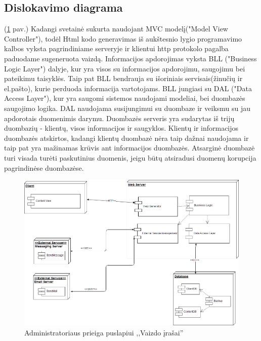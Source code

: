 \documentclass{VUMIFPSkursinis}
\begin{document}
		\subsection{Dislokavimo diagrama} (\ref{fig:dislokavimo} pav.)
		Kadangi svetainė sukurta naudojant MVC modelį("Model View Controller"), todėl Html kodo generavimas iš aukštesnio lygio programavimo kalbos vyksta pagrindiniame serveryje ir klientui http protokolo pagalba paduodame sugeneruota vaizdą. Informacijos apdorojimas vyksta BLL ("Business Logic Layer") dalyje, kur yra visos su informacijos apdorojimu, saugojimu bei pateikimu taisyklės. Taip pat BLL bendrauja su išoriniais servisais(žinučių ir el.pašto), kurie perduoda informacija vartotojams. BLL jungiasi su DAL ("Data Access Layer"), kur yra saugomi sistemos naudojami modeliai, bei duombazės saugojimo logika. DAL naudojama susijungimui su duombaze ir veiksmu su jau apdorotais duomenimis darymu. Duombazės serveris yra sudarytas iš trijų duombazių - klientų, visos informacijos ir saugyklos. Klientų ir informacijos duombazės atskirtos, kadangi klientų duombazė nėra taip dažnai naudojama ir taip pat yra mažinamas krūvis ant informacijos duombazės. Atsarginė duombazė turi visada turėti paskutinius duomenis, jeigu būtų atsiradusi duomenų korupcija pagrindinėse duombazėse.
		\begin{figure}[H]
			\centering
			\includegraphics[width=\textwidth]{img/PSI5/DeployementDiagram.png}
			\caption{Administratoriaus prieiga puslapiui ,,Vaizdo įrašai''}
			\label{fig:dislokavimo}
		\end{figure}
		
\end{document}

